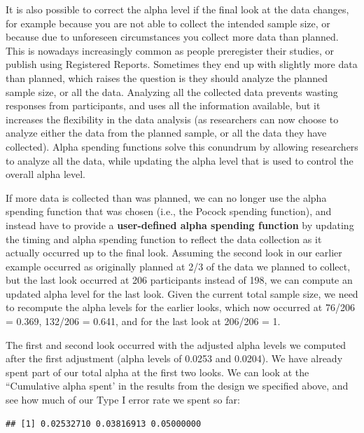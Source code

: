 \documentclass[
  oneside]{book}
\newenvironment{Shaded}{\begin{snugshade}}{\end{snugshade}}
\newcommand{\NormalTok}[1]{#1}
\newcommand{\SpecialCharTok}[1]{\textcolor[rgb]{0.00,0.00,0.00}{#1}}
\begin{document}
It is also possible to correct the alpha level if the final look at the data changes, for example because you are not able to collect the intended sample size, or because due to unforeseen circumstances you collect more data than planned. This is nowadays increasingly common as people preregister their studies, or publish using Registered Reports. Sometimes they end up with slightly more data than planned, which raises the question is they should analyze the planned sample size, or all the data. Analyzing all the collected data prevents wasting responses from participants, and uses all the information available, but it increases the flexibility in the data analysis (as researchers can now choose to analyze either the data from the planned sample, or all the data they have collected). Alpha spending functions solve this conundrum by allowing researchers to analyze all the data, while updating the alpha level that is used to control the overall alpha level.

If more data is collected than was planned, we can no longer use the alpha spending function that was chosen (i.e., the Pocock spending function), and instead have to provide a \textbf{user-defined alpha spending function} by updating the timing and alpha spending function to reflect the data collection as it actually occurred up to the final look. Assuming the second look in our earlier example occurred as originally planned at 2/3 of the data we planned to collect, but the last look occurred at 206 participants instead of 198, we can compute an updated alpha level for the last look. Given the current total sample size, we need to recompute the alpha levels for the earlier looks, which now occurred at 76/206 = 0.369, 132/206 = 0.641, and for the last look at 206/206 = 1.

The first and second look occurred with the adjusted alpha levels we computed after the first adjustment (alpha levels of 0.0253 and 0.0204). We have already spent part of our total alpha at the first two looks. We can look at the ``Cumulative alpha spent' in the results from the design we specified above, and see how much of our Type I error rate we spent so far:

\begin{Shaded}
\end{Shaded}

\begin{verbatim}
## [1] 0.02532710 0.03816913 0.05000000
\end{verbatim}
\end{document}
